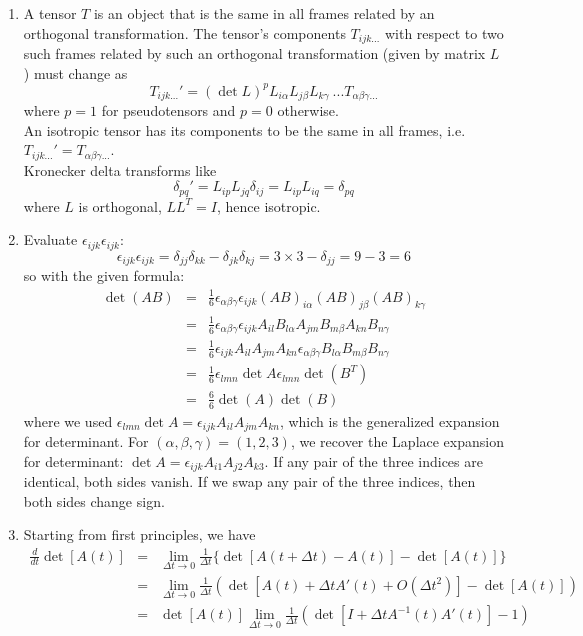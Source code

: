 \documentclass[a4paper]{article}
\begin{document}
\begin{ans}\leavevmode
\begin{enumerate}[label=(\roman*)]
\item A tensor $T$ is an object that is the same in all frames related by an orthogonal transformation. The tensor's components $T_{ijk...}$ with respect to two such frames related by such an orthogonal transformation (given by matrix $L$) must change as 
$$T_{ijk...}'=(\det L)^pL_{i\alpha}L_{j\beta}L_{k\gamma}~...T_{\alpha\beta\gamma...}$$
where $p=1$ for pseudotensors and $p=0$ otherwise.\\[5pt]
An isotropic tensor has its components to be the same in all frames, i.e. $T_{ijk...}'=T_{\alpha\beta\gamma...}$.\\[5pt]
Kronecker delta transforms like
$$\delta_{pq}'=L_{ip}L_{jq}\delta_{ij}=L_{ip}L_{iq}=\delta_{pq}$$
where $L$ is orthogonal, $LL^T=I$, hence isotropic.
\item 
Evaluate $\epsilon_{ijk}\epsilon_{ijk}$:
$$\epsilon_{ijk}\epsilon_{ijk}=\delta_{jj}\delta_{kk}-\delta_{jk}\delta_{kj}=3\times 3-\delta_{jj}=9-3=6$$
so with the given formula:
\begin{eqnarray}
\det(AB)&=&\frac{1}{6}\epsilon_{\alpha\beta\gamma}\epsilon_{ijk}(AB)_{i\alpha}(AB)_{j\beta}(AB)_{k\gamma}\nonumber\\&=&\frac{1}{6}\epsilon_{\alpha\beta\gamma}\epsilon_{ijk}A_{il}B_{l\alpha}A_{jm}B_{m\beta}A_{kn}B_{n\gamma}\nonumber\\&=&\frac{1}{6}\epsilon_{ijk}A_{il}A_{jm}A_{kn}\epsilon_{\alpha\beta\gamma}B_{l\alpha}B_{m\beta}B_{n\gamma}\nonumber\\&=&\frac{1}{6}\epsilon_{lmn}\det A\epsilon_{lmn}\det(B^T)\nonumber\\&=&\frac{6}{6}\det(A)\det(B)\nonumber
\end{eqnarray}
where we used $\epsilon_{lmn}\det A=\epsilon_{ijk}A_{il}A_{jm}A_{kn}$, which is the generalized expansion for determinant. For $(\alpha,\beta,\gamma)=(1,2,3)$, we recover the Laplace expansion for determinant: $\det A=\epsilon_{ijk}A_{i1}A_{j2}A_{k3}$. If any pair of the three indices are identical, both sides vanish. If we swap any pair of the three indices, then both sides change sign.
\item Starting from first principles, we have
\begin{eqnarray}
\frac{d}{dt}\det[A(t)]&=&\lim_{\Delta t\rightarrow 0}\frac{1}{\Delta t}\bigg\{\det[A(t+\Delta t)-A(t)]-\det[A(t)]\bigg\}\nonumber\\&=&\lim_{\Delta t\rightarrow 0}\frac{1}{\Delta t}(\det[A(t)+\Delta tA'(t)+O(\Delta t^2)]-\det[A(t)])\nonumber\\&=&\det[A(t)]\lim_{\Delta t\rightarrow 0}\frac{1}{\Delta t}(\det[I+\Delta tA^{-1}(t)A'(t)]-1)\nonumber

\end{eqnarray}
\end{enumerate}
\end{ans}
\end{document}
